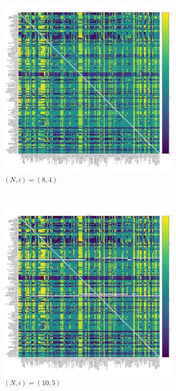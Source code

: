 \documentclass{article}
\begin{document}
\begin{figure}[!hbtp]
    \begin{subfigure}[t]{.3\textwidth}
        \centering
        \includegraphics[width=.8\textwidth]{../img/fixation_heatmap_8_coexist.pdf}
        \caption{\((N,i)=(8, 4)\)}
    \end{subfigure}%
    ~
    \begin{subfigure}[t]{.3\textwidth}
        \centering
        \includegraphics[width=.8\textwidth]{../img/fixation_heatmap_10_coexist.pdf}
        \caption{\((N,i)=(10, 5)\)}
    \end{subfigure}%
    ~
    \begin{subfigure}[t]{.3\textwidth}

\end{subfigure}
\end{figure}
\end{document}
